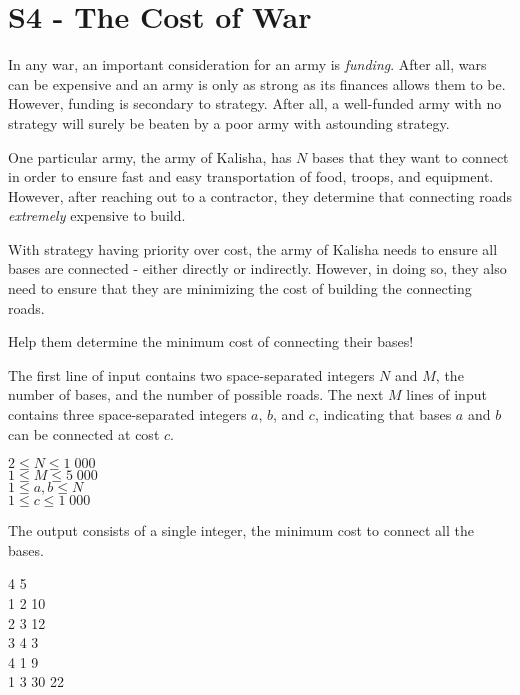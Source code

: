 \section*{S4 - The Cost of War}
In any war, an important consideration for an army is \textit{funding}. After all, wars can be expensive and an army is only as strong as its finances allows them to be. However, funding is secondary to strategy. After all, a well-funded army with no strategy will surely be beaten by a poor army with astounding strategy.

One particular army, the army of Kalisha, has $N$ bases that they want to connect in order to ensure fast and easy transportation of food, troops, and equipment. However, after reaching out to a contractor, they determine that connecting roads \textit{extremely} expensive to build.

With strategy having priority over cost, the army of Kalisha needs to ensure all bases are connected - either directly or indirectly. However, in doing so, they also need to ensure that they are minimizing the cost of building the connecting roads. 

Help them determine the minimum cost of connecting their bases!

The first line of input contains two space-separated integers $N$ and $M$, the number of bases, and the number of possible roads. The next $M$ lines of input contains three space-separated integers $a$, $b$, and $c$, indicating that bases $a$ and $b$ can be connected at cost $c$.

\constraints
$2 \leq N \leq 1\;000$ \\
$1 \leq M \leq 5\;000$ \\
$1 \leq a, b \leq N$ \\
$1 \leq c \leq 1\;000$

\outputformat
The output consists of a single integer, the minimum cost to connect all the bases.

\addsample
{
    4 5 \\
    1 2 10 \\
    2 3 12 \\
    3 4 3 \\
    4 1 9 \\
    1 3 30
}
{
    22
}